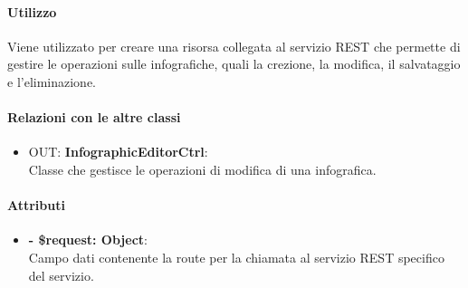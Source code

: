 		\paragraph{Utilizzo}
		Viene utilizzato per creare una risorsa collegata al servizio REST che permette di gestire le operazioni sulle infografiche, quali la crezione, la modifica, il salvataggio e l'eliminazione.
		
		\paragraph{Relazioni con le altre classi}
		\begin{itemize}
			\item OUT: \textbf{InfographicEditorCtrl}:\\
			Classe che gestisce le operazioni di modifica di una infografica.
		\end{itemize}
		
		\paragraph{Attributi}
		\begin{itemize}
			\item \textbf{- \$request: Object}:\\
			Campo dati contenente la route per la chiamata al servizio REST specifico del servizio.
		\end{itemize}	
		
